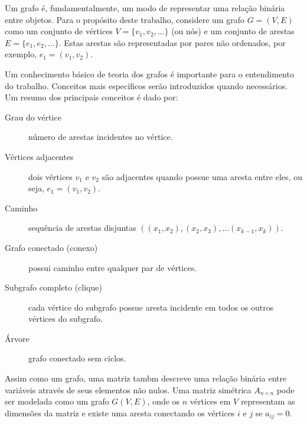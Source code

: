 Um grafo é, fundamentalmente, um modo de representar uma relação binária entre objetos. Para o propósito deste trabalho, considere um grafo $G = (V, E)$ como um conjunto de vértices $V = \{v_1, v_2, \ldots \}$ (ou nós) e um conjunto de arestas $E = \{e_1, e_2, \ldots \}$. Estas arestas são representadas por pares não ordenados, por exemplo, $e_1 = (v_1 , v_2)$.

Um conhecimento básico de teoria dos grafos é importante para o entendimento do trabalho. Conceitos mais específicos serão introduzidos quando necessários. Um resumo dos principais conceitos é dado por:
\begin{description}
    \item[Grau do vértice] número de arestas incidentes no vértice.
    \item[Vértices adjacentes]  dois vértices $v_1$ e $v_2$ são adjacentes quando possue uma aresta entre eles, ou seja, $e_1 = (v_1, v_2)$.
    \item[Caminho] sequência de arestas disjuntas $\left( (x_1, x_2), (x_2, x_3), \ldots (x_{k - 1}, x_k) \right)$.
    \item[Grafo conectado (conexo)] possui caminho entre qualquer par de vértices.
    \item[Subgrafo completo (clique)] cada vértice do subgrafo possue aresta incidente em todos os outros vértices do subgrafo.
    \item[Árvore] grafo conectado sem ciclos.
\end{description}

Assim como um grafo, uma matriz tambm descreve uma relação binária entre variáveis através de seus elementos não nulos. Uma matriz simétrica $A_{n \times n}$ pode ser modelada como um grafo $G(V, E)$, onde os $n$ vértices em $V$ representam as dimensões da matriz e existe uma aresta conectando os vértices $i$ e $j$ se $a_{ij} = 0$.
